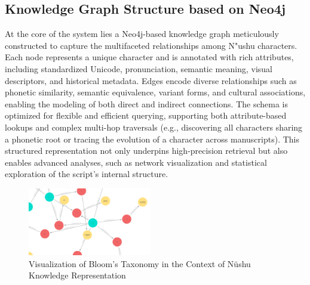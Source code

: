 \documentclass{article}
\begin{document}
\subsection{Knowledge Graph Structure based on Neo4j}
\label{ssec:kg_structure}
    At the core of the system lies a Neo4j-based knowledge graph meticulously constructed to capture the multifaceted relationships among N"{u}shu characters. Each node represents a unique character and is annotated with rich attributes, including standardized Unicode, pronunciation, semantic meaning, visual descriptors, and historical metadata. Edges encode diverse relationships such as phonetic similarity, semantic equivalence, variant forms, and cultural associations, enabling the modeling of both direct and indirect connections. The schema is optimized for flexible and efficient querying, supporting both attribute-based lookups and complex multi-hop traversals (e.g., discovering all characters sharing a phonetic root or tracing the evolution of a character across manuscripts). This structured representation not only underpins high-precision retrieval but also enables advanced analyses, such as network visualization and statistical exploration of the script's internal structure.

    \begin{figure}[htb]
    \centering
    \includegraphics[width=0.48\textwidth]{images/bloom-visualisation.png}
    \caption{Visualization of Bloom's Taxonomy in the Context of N\"{u}shu Knowledge Representation}
    \label{fig:bloom_visualisation}
    \end{figure}

    
\end{document}
